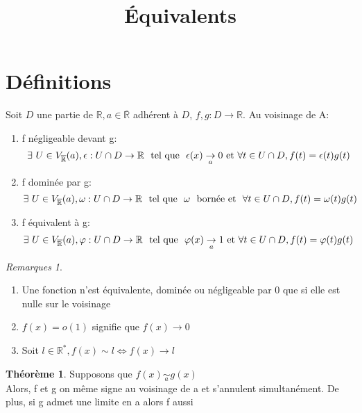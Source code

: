 \documentclass[fleqn]{article}
\title{\'Equivalents}
\date{}
\theoremstyle{definition} \newtheorem*{defi}{D\'efinition}
\theoremstyle{definition} \newtheorem*{theo}{Th\'eor\`eme}
\theoremstyle{remark} \newtheorem*{rqs}{Remarques}
\begin{document}
\maketitle

\section{D\'efinitions}
Soit $D$ une partie de $\mathbb{R}, a \in \overline{\mathbb{R}}$ adh\'erent \`a $D$, $f,g: D \rightarrow \mathbb{R}$. Au voisinage de A:
\begin{enumerate}
	\item f n\'egligeable devant g:
		\[\exists\ U \in V_{\overline{\mathbb{R}}%
		}(a), \epsilon: U \cap D \rightarrow \mathbb{R}$ \text{ tel que }
		$\epsilon(x)\underset{a}{\rightarrow}  0$ et $\forall t \in U \cap D, f(t)=\epsilon(t)g(t)\]
	\item f domin\'ee par g:
		\[\exists\ U \in V_{\overline{\mathbb{R}}%
		}(a), \omega: U \cap D \rightarrow \mathbb{R}$ \text{ tel que } $\omega$ \text{ born\'ee et }
		$\forall t \in U \cap D, f(t)=\omega(t)g(t)\]
	\item f \'equivalent \`a g:
		\[\exists\ U \in V_{\overline{\mathbb{R}}%
		}(a), \varphi: U \cap D \rightarrow \mathbb{R}$ \text{ tel que }
		$\varphi(x)\underset{a}{\rightarrow} 1$ et $\forall t \in U \cap D, f(t)=\varphi(t)g(t)\]
\end{enumerate}

\begin{rqs} $ $
	\begin{enumerate}
		\item Une fonction n'est \'equivalente, domin\'ee ou n\'egligeable par 0 que si elle est nulle sur le voisinage
		\item $f(x) = o(1)$ signifie que $f(x) \rightarrow 0$
		\item Soit $l \in \mathbb{R}^{*}, f(x) \sim l \Leftrightarrow f(x) \rightarrow l$
	\end{enumerate}
\end{rqs}

\begin{theo}
	Supposons que $f(x)\underset{a}{\sim} g(x)$\\
	Alors, f et g on m\^eme signe au voisinage de a et s'annulent simultan\'ement. De plus, si g admet une limite en a alors f aussi
\end{theo}

\end{document}
